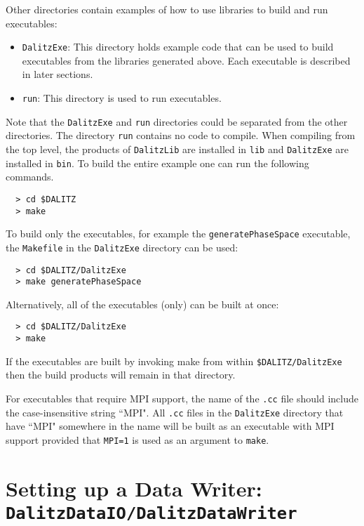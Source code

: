 \documentclass[10pt]{article}
\begin{document}
Other directories contain examples of how to use libraries to build and run executables:
\begin{itemize}
\item {\tt DalitzExe}:  This directory holds example code that can be used to build executables from the libraries generated above.  Each executable is described in later sections.
\item {\tt run}:  This directory is used to run executables.
\end{itemize}

Note that the {\tt DalitzExe} and {\tt run} directories could be separated from the other directories.  The directory {\tt run} contains no code to compile.  When compiling from the top level, the products of {\tt DalitzLib} are installed in {\tt lib} and {\tt DalitzExe} are installed in {\tt bin}.  To build the entire example one can run the following commands.

\begin{verbatim}
  > cd $DALITZ
  > make
\end{verbatim}

To build only the executables, for example the {\tt generatePhaseSpace} executable, the {\tt Makefile} in the {\tt DalitzExe} directory can be used:
\begin{verbatim}
  > cd $DALITZ/DalitzExe
  > make generatePhaseSpace
\end{verbatim}

Alternatively, all of the executables (only) can be built at once:
\begin{verbatim}
  > cd $DALITZ/DalitzExe
  > make
\end{verbatim}

If the executables are built by invoking make from within {\tt \$DALITZ/DalitzExe} then the build products will remain in that directory.

For executables that require MPI support, the name of the {\tt *.cc} file should include the case-insensitive string ``MPI".  All {\tt *.cc} files in the {\tt DalitzExe} directory that have ``MPI" somewhere in the name will be built as an executable with MPI support provided that {\tt MPI=1} is used as an argument to {\tt make}.

\section{Setting up a Data Writer: \\ 
{\tt DalitzDataIO/DalitzDataWriter}}
\label{sec:dw}
\end{document}
